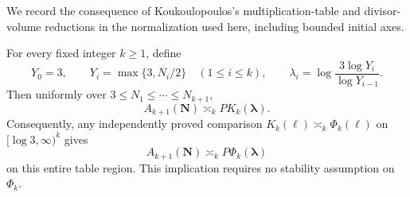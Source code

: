 We record the consequence of Koukoulopoulos's multiplication-table and
divisor-volume reductions in the normalization used here, including
bounded initial axes.

\begin{theorem}\label{thm:full-table-transfer}
For every fixed integer $k\ge1$, define
\[
 Y_0=3,\qquad Y_i=\max\{3,N_i/2\}\quad(1\le i\le k),
 \qquad \lambda_i=\log\frac{3\log Y_i}{\log Y_{i-1}}.
\]
Then uniformly over $3\le N_1\le\cdots\le N_{k+1}$,
\begin{equation}\label{eq:table-K-transfer}
 A_{k+1}(\mathbf N)\asymp_k P K_k(\boldsymbol\lambda).
\end{equation}
Consequently, any independently proved comparison
$K_k(\boldsymbol\ell)\asymp_k\Phi_k(\boldsymbol\ell)$ on
$[\log3,\infty)^k$ gives
\[
 A_{k+1}(\mathbf N)\asymp_k P\Phi_k(\boldsymbol\lambda)
\]
on this entire table region. This implication requires no stability
assumption on $\Phi_k$.
\end{theorem}

